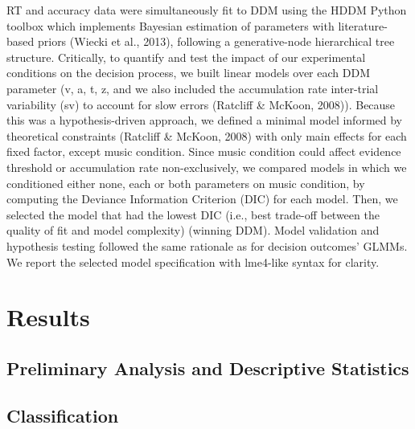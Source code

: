 \documentclass[
  man,floatsintext]{apa6}
\begin{document}
RT and accuracy data were simultaneously fit to DDM using the HDDM Python toolbox which implements Bayesian estimation of parameters with literature-based priors (Wiecki et al., 2013), following a generative-node hierarchical tree structure. Critically, to quantify and test the impact of our experimental conditions on the decision process, we built linear models over each DDM parameter (v, a, t, z, and we also included the accumulation rate inter-trial variability (sv) to account for slow errors (Ratcliff \& McKoon, 2008)). Because this was a hypothesis-driven approach, we defined a minimal model informed by theoretical constraints (Ratcliff \& McKoon, 2008) with only main effects for each fixed factor, except music condition. Since music condition could affect evidence threshold or accumulation rate non-exclusively, we compared models in which we conditioned either none, each or both parameters on music condition, by computing the Deviance Information Criterion (DIC) for each model. Then, we selected the model that had the lowest DIC (i.e., best trade-off between the quality of fit and model complexity) (winning DDM). Model validation and hypothesis testing followed the same rationale as for decision outcomes' GLMMs. We report the selected model specification with lme4-like syntax for clarity.

\hypertarget{results}{%
\section{Results}\label{results}}

\hypertarget{preliminary-analysis-and-descriptive-statistics}{%
\subsection{Preliminary Analysis and Descriptive Statistics}\label{preliminary-analysis-and-descriptive-statistics}}

\hypertarget{classification}{%
\subsection{Classification}\label{classification}}
\end{document}
